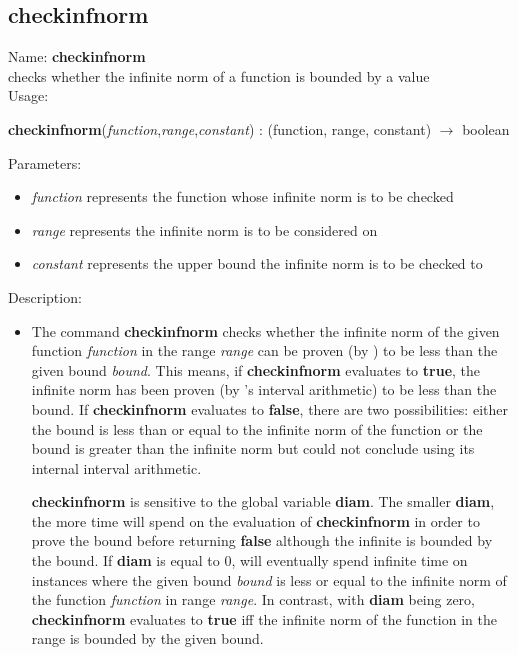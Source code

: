 \subsection{checkinfnorm}
\label{labcheckinfnorm}
\noindent Name: \textbf{checkinfnorm}\\
checks whether the infinite norm of a function is bounded by a value\\

\noindent Usage: 
\begin{center}
\textbf{checkinfnorm}(\emph{function},\emph{range},\emph{constant}) : (\textsf{function}, \textsf{range}, \textsf{constant}) $\rightarrow$ \textsf{boolean}\\
\end{center}
Parameters: 
\begin{itemize}
\item \emph{function} represents the function whose infinite norm is to be checked
\item \emph{range} represents the infinite norm is to be considered on
\item \emph{constant} represents the upper bound the infinite norm is to be checked to
\end{itemize}
\noindent Description: \begin{itemize}

\item The command \textbf{checkinfnorm} checks whether the infinite norm of the given
   function \emph{function} in the range \emph{range} can be proven (by \sollya) to
   be less than the given bound \emph{bound}. This means, if \textbf{checkinfnorm}
   evaluates to \textbf{true}, the infinite norm has been proven (by \sollya's
   interval arithmetic) to be less than the bound. If \textbf{checkinfnorm} evaluates
   to \textbf{false}, there are two possibilities: either the bound is less than
   or equal to the infinite norm of the function or the bound is greater
   than the infinite norm but \sollya could not conclude using its
   internal interval arithmetic.
    
   \textbf{checkinfnorm} is sensitive to the global variable \textbf{diam}. The smaller \textbf{diam},
   the more time \sollya will spend on the evaluation of \textbf{checkinfnorm} in
   order to prove the bound before returning \textbf{false} although the infinite
   is bounded by the bound. If \textbf{diam} is equal to $0$, \sollya will
   eventually spend infinite time on instances where the given bound
   \emph{bound} is less or equal to the infinite norm of the function
   \emph{function} in range \emph{range}. In contrast, with \textbf{diam} being zero,
   \textbf{checkinfnorm} evaluates to \textbf{true} iff the infinite norm of the function in
   the range is bounded by the given bound.
\end{itemize}
